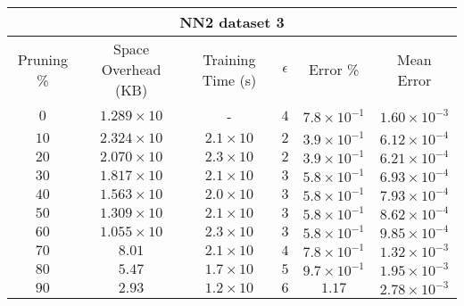 \begin{adjustwidth}{0cm}{}
\begin{tabular}{cccccc}
\hline
\multicolumn{6}{c}{NN2 dataset 3} \\
\toprule
Pruning \% & Space Overhead (KB) & Training Time (s) & $\epsilon$ & Error \% & Mean Error\\
\midrule
$0$ & $1.289 \times 10$ & - & $4$ & $7.8 \times 10^{-1}$ & $1.60 \times 10^{-3}$\\
$10$ & $2.324 \times 10$ & $2.1 \times 10$ & $2$ & $3.9 \times 10^{-1}$ & $6.12 \times 10^{-4}$\\
$20$ & $2.070 \times 10$ & $2.3 \times 10$ & $2$ & $3.9 \times 10^{-1}$ & $6.21 \times 10^{-4}$\\
$30$ & $1.817 \times 10$ & $2.1 \times 10$ & $3$ & $5.8 \times 10^{-1}$ & $6.93 \times 10^{-4}$\\
$40$ & $1.563 \times 10$ & $2.0 \times 10$ & $3$ & $5.8 \times 10^{-1}$ & $7.93 \times 10^{-4}$\\
$50$ & $1.309 \times 10$ & $2.1 \times 10$ & $3$ & $5.8 \times 10^{-1}$ & $8.62 \times 10^{-4}$\\
$60$ & $1.055 \times 10$ & $2.3 \times 10$ & $3$ & $5.8 \times 10^{-1}$ & $9.85 \times 10^{-4}$\\
$70$ & $8.01$ & $2.1 \times 10$ & $4$ & $7.8 \times 10^{-1}$ & $1.32 \times 10^{-3}$\\
$80$ & $5.47$ & $1.7 \times 10$ & $5$ & $9.7 \times 10^{-1}$ & $1.95 \times 10^{-3}$\\
$90$ & $2.93$ & $1.2 \times 10$ & $6$ & $1.17$ & $2.78 \times 10^{-3}$\\
\bottomrule
\end{tabular}
\end{adjustwidth}

\null\par\null

